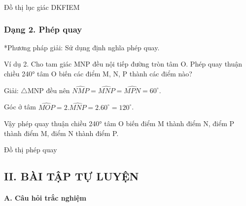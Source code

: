 \documentclass[%
    fontsize=12pt,%
    chapterprefix=false,%
    open=right,%
    twoside=false,%
    numbers=noenddot,%
    headings=optiontohead,%
    final,%
    DIV=15,%
    parskip=half %
]{scrbook}
\begin{document}
Đồ thị lục giác DKFIEM
\subsubsection{Dạng 2. Phép quay}

*Phương pháp giải: Sử dụng định nghĩa phép quay.

Ví dụ 2. Cho tam giác MNP đều nội tiếp đường tròn tâm O. Phép quay thuận chiều 240° tâm O biến các điểm M, N, P thành các điểm nào?

Giải: $\triangle$MNP đều nên $ \widehat{NMP} = \widehat{MNP} = \widehat{MPN} = 60^\circ $.

Góc ở tâm $ \widehat{MOP} = 2.\widehat{MNP} = 2.60^\circ = 120^\circ $.

Vậy phép quay thuận chiều 240° tâm O biến điểm M thành điểm N, điểm P thành điểm M, điểm N thành điểm P.

Đồ thị phép quay
\subsection{II. BÀI TẬP TỰ LUYỆN}
\paragraph{A. Câu hỏi trắc nghiệm}
\end{document}
